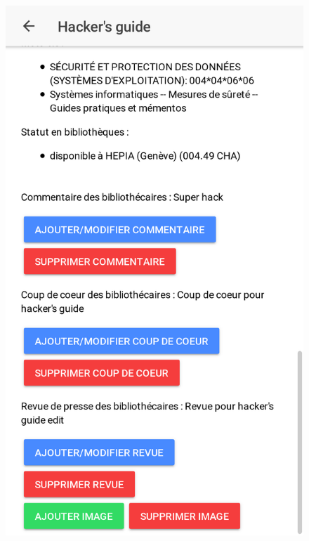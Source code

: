 \documentclass[10pt]{beamer}
\begin{document}
\begin{frame}
\begin{columns}[T]
\begin{column}{.3\textwidth}
\begin{figure}
                \includegraphics[width=1\textwidth]{images/screenshots/android7.png}
            \end{figure}
        \end{column}
    \end{columns}
\end{frame}
\end{document}

